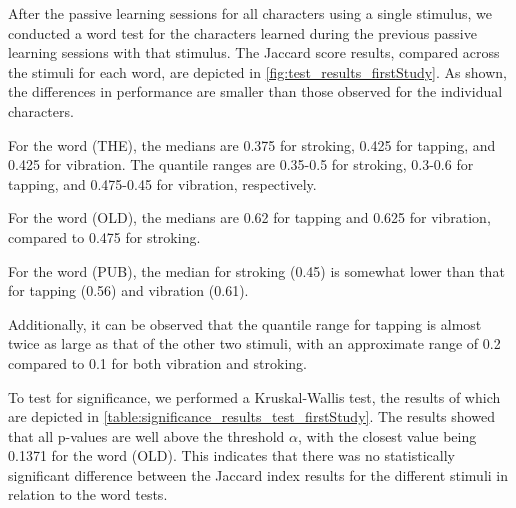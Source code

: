 After the passive learning sessions for all characters using a single stimulus, we conducted a word test for the characters learned during the previous passive learning sessions with that stimulus. 
The Jaccard score results, compared across the stimuli for each word, are depicted in \autoref{fig:test_results_firstStudy}. 
As shown, the differences in performance are smaller than those observed for the individual characters. 

For the word (THE), the medians are 0.375 for stroking, 0.425 for tapping, and 0.425 for vibration. The quantile ranges are 0.35-0.5 for stroking, 0.3-0.6 for tapping, and 0.475-0.45 for vibration, respectively.

For the word (OLD), the medians are 0.62 for tapping and 0.625 for vibration, compared to 0.475 for stroking.

For the word (PUB), the median for stroking (0.45) is somewhat lower than that for tapping (0.56) and vibration (0.61). 

Additionally, it can be observed that the quantile range for tapping is almost twice as large as that of the other two stimuli, with an approximate range of 0.2 compared to 0.1 for both vibration and stroking.



To test for significance, we performed a Kruskal-Wallis test, the results of which are depicted in \autoref{table:significance_results_test_firstStudy}. 
The results showed that all p-values are well above the threshold $\alpha$, with the closest value being 0.1371 for the word (OLD). 
This indicates that there was no statistically significant difference between the Jaccard index results for the different stimuli in relation to the word tests.



